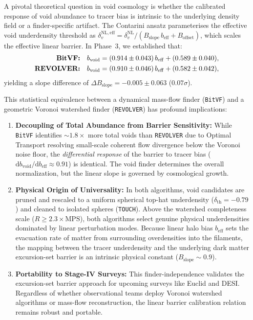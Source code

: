 \documentclass[12pt]{report}
\begin{document}
A pivotal theoretical question in void cosmology is whether the calibrated response of void abundance to tracer bias is intrinsic to the underlying density field or a finder-specific artifact. The Contarini ansatz \citep{Contarini2019,Contarini2021} parameterises the effective void underdensity threshold as $\delta_v^{\mathrm{NL,eff}} = \delta_v^{\mathrm{NL}} / (B_{\mathrm{slope}}\,b_{\mathrm{eff}} + B_{\mathrm{offset}})$, which scales the effective linear barrier. In Phase~3, we established that:
\begin{align}
    \text{\textbf{BitVF:}} \quad & b_{\mathrm{void}} = (0.914 \pm 0.043)\,b_{\mathrm{eff}} + (0.589 \pm 0.040), \\
    \text{\textbf{REVOLVER:}} \quad & b_{\mathrm{void}} = (0.910 \pm 0.046)\,b_{\mathrm{eff}} + (0.582 \pm 0.042),
\end{align}
yielding a slope difference of $\Delta B_{\mathrm{slope}} = -0.005 \pm 0.063$ ($0.07\sigma$).

This statistical equivalence between a dynamical mass-flow finder (\texttt{BitVF}) and a geometric Voronoi watershed finder (\texttt{REVOLVER}) has profound implications:
\begin{enumerate}
    \item \textbf{Decoupling of Total Abundance from Barrier Sensitivity:} While \texttt{BitVF} identifies $\sim 1.8\times$ more total voids than \texttt{REVOLVER} due to Optimal Transport resolving small-scale coherent flow divergence below the Voronoi noise floor, the \emph{differential response} of the barrier to tracer bias ($\mathrm{d}b_{\mathrm{void}}/\mathrm{d}b_{\mathrm{eff}} \approx 0.91$) is identical. The void finder determines the overall normalization, but the linear slope is governed by cosmological growth.
    \item \textbf{Physical Origin of Universality:} In both algorithms, void candidates are pruned and rescaled to a uniform spherical top-hat underdensity ($\delta_{\mathrm{th}} = -0.79$) and cleaned to isolated spheres (\texttt{TOUCH}). Above the watershed completeness scale ($R \ge 2.3 \times \mathrm{MPS}$), both algorithms select genuine physical underdensities dominated by linear perturbation modes. Because linear halo bias $b_{\mathrm{eff}}$ sets the evacuation rate of matter from surrounding overdensities into the filaments, the mapping between the tracer underdensity and the underlying dark matter excursion-set barrier is an intrinsic physical constant ($B_{\mathrm{slope}} \sim 0.9$).
    \item \textbf{Portability to Stage-IV Surveys:} This finder-independence validates the excursion-set barrier approach for upcoming surveys like Euclid and DESI. Regardless of whether observational teams deploy Voronoi watershed algorithms or mass-flow reconstruction, the linear barrier calibration relation remains robust and portable.
\end{enumerate}
\end{document}
